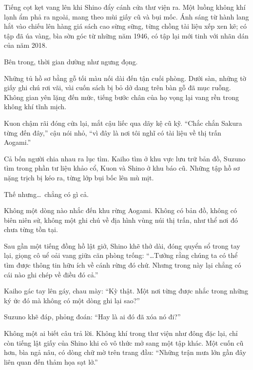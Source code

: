 \documentclass[../main.tex]{subfiles}
\begin{document}

Tiếng cọt kẹt vang lên khi Shino đẩy cánh cửa thư viện ra. Một luồng không khí lạnh ẩm phả ra ngoài, mang theo mùi giấy cũ và bụi mốc. Ánh sáng từ hành lang hắt vào chiếu lên hàng giá sách cao sừng sững, từng chồng tài liệu xếp xen kẽ; có tập đã úa vàng, bìa sờn góc từ những năm 1946, có tập lại mới tinh với nhãn dán của năm 2018.

Bên trong, thời gian dường như ngưng đọng.

Những tủ hồ sơ bằng gỗ tối màu nối dài đến tận cuối phòng. Dưới sàn, những tờ giấy ghi chú rơi vãi, vài cuốn sách bị bỏ dở dang trên bàn gỗ đã mục ruỗng. Không gian yên lặng đến mức, tiếng bước chân của họ vọng lại vang rền trong không khí tĩnh mịch.

Kuon chậm rãi đóng cửa lại, mắt cậu liếc qua dãy kệ cũ kỹ. ``Chắc chắn Sakura từng đến đây,'' cậu nói nhỏ, ``vì đây là nơi tôi nghĩ có tài liệu về thị trấn Aogami.''

Cả bốn người chia nhau ra lục tìm. Kaiho tìm ở khu vực lưu trữ bản đồ, Suzuno tìm trong phần tư liệu khảo cổ, Kuon và Shino ở khu báo cũ. Những tập hồ sơ nặng trịch bị kéo ra, từng lớp bụi bốc lên mù mịt.

Thế nhưng\dots\ chẳng có gì cả.

Không một dòng nào nhắc đến khu rừng Aogami. Không có bản đồ, không có biên niên sử, không một ghi chú về địa hình vùng núi thị trấn, như thể nơi đó chưa từng tồn tại.

Sau gần một tiếng đồng hồ lật giở, Shino khẽ thở dài, đóng quyển sổ trong tay lại, giọng cô uể oải vang giữa căn phòng trống: ``\dots Tưởng rằng chúng ta có thể tìm được thông tin hữu ích về cánh rừng đó chứ. Nhưng trong này lại chẳng có cái nào ghi chép về điều đó cả.''

Kaiho gác tay lên gáy, chau mày: ``Kỳ thật. Một nơi từng được nhắc trong những ký ức đó mà không có một dòng ghi lại sao?''

Suzuno khẽ đáp, phỏng đoán: ``Hay là ai đó đã xóa nó đi?''

Không một ai biết câu trả lời. Không khí trong thư viện như đông đặc lại, chỉ còn tiếng lật giấy của Shino khi cô vô thức mở sang một tập khác. Một cuốn cũ hơn, bìa ngả nâu, có dòng chữ mờ trên trang đầu: ``Những trận mưa lớn gần đây liên quan đến thảm họa sạt lở.''
\end{document}
